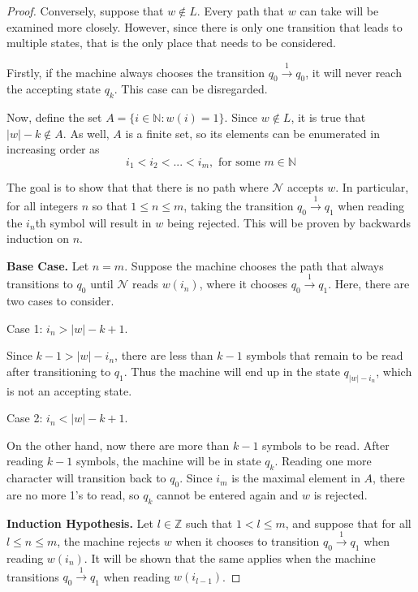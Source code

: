 \documentclass[11pt]{article}
\begin{document}
\begin{enumerate}[label=\textbf{Q\arabic*.}]
\begin{enumerate}[label=\textit{\alph*)}]
\begin{proof}
	Conversely, suppose that \(w \notin L\). Every path that \(w\) can take will be examined more closely. However, since there is only one transition that leads to multiple states, that is the only place that needs to be considered.

	Firstly, if the machine always chooses the transition \(q_0 \xrightarrow{1} q_0\), it will never reach the accepting state \(q_k\). This case can be disregarded.

	Now, define the set \(A = \{i \in \mathbb{N} : w(i) = 1\}\). Since \(w \notin L\), it is true that \(|w| - k \notin A\). As well, \(A\) is a finite set, so its elements can be enumerated in increasing order as
	\[
		i_1 < i_2 < ... < i_m, \text{ for some } m \in \mathbb{N}
	\]
	
	The goal is to show that that there is no path where \(\mathcal{N}\) accepts \(w\). In particular, for all integers \(n\) so that \(1 \leq n \leq m\), taking the transition \(q_0 \xrightarrow{1} q_1\) when reading the \(i_n\)th symbol will result in \(w\) being rejected. This will be proven by backwards induction on \(n\).

	\medskip

	\textbf{Base Case.} Let \(n = m\). Suppose the machine chooses the path that always transitions to \(q_0\) until \(\mathcal{N}\) reads \(w(i_n)\), where it chooses \(q_0 \xrightarrow{1} q_1\). Here, there are two cases to consider.

	Case 1: \(i_n > |w| - k + 1\).

	Since \(k - 1 > |w| - i_n\), there are less than \(k - 1\) symbols that remain to be read after transitioning to \(q_1\). Thus the machine will end up in the state \(q_{|w| - i_n}\), which is not an accepting state.

	Case 2: \(i_n < |w| - k + 1\).

	On the other hand, now there are more than \(k - 1\) symbols to be read. After reading \(k-1\) symbols, the machine will be in state \(q_k\). Reading one more character will transition back to \(q_0\). Since \(i_m\) is the maximal element in \(A\), there are no more 1's to read, so \(q_k\) cannot be entered again and \(w\) is rejected.

	\medskip

	\textbf{Induction Hypothesis.} Let \(l \in \mathbb{Z}\) such that \(1 < l \leq m\), and suppose that for all \(l \leq n \leq m\), the machine rejects \(w\) when it chooses to transition \(q_0 \xrightarrow{1} q_1\) when reading \(w(i_n)\). It will be shown that the same applies when the machine transitions \(q_0 \xrightarrow{1} q_1\) when reading \(w(i_{l-1})\).


\end{proof}
\end{enumerate}
\end{enumerate}
\end{document}
